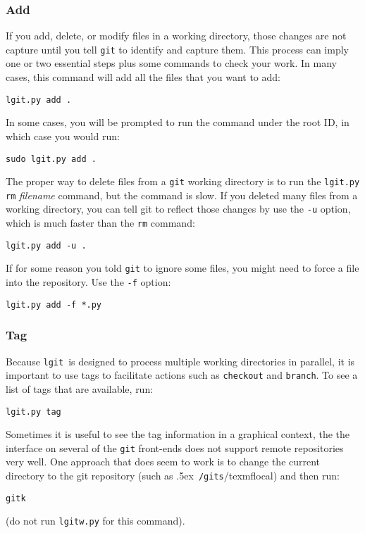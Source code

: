 \documentclass{ltxdoc}
\def\bobtilde{\lower.5ex\hbox{\tt \string~}}%
\def\ucmd#1{{\tt {#1}}}
\def\lgit{{\tt lgit}}
\def\mygits{\bobtilde\ucmd{/gits}}
\begin{document}
\subsubsection{Add}
If you add, delete, or modify files in a working directory, those changes are not capture until you tell \ucmd{git} to identify and capture them.  This process can imply one or two essential steps plus some commands to check your work. In many cases, this command will add all the files that you want to add:
\begin{verbatim}
lgit.py add .
\end{verbatim}
In some cases, you will be prompted to run the command under the root ID, in which case you would run:
\begin{verbatim}
sudo lgit.py add .
\end{verbatim}

The proper way to delete files from a \ucmd{git} working directory is to run the \ucmd{lgit.py rm} \emph{filename} command, but the command is slow.  If you deleted many files from a working directory, you can tell git to reflect those changes by use the \ucmd{-u} option, which is much faster than the \ucmd{rm} command:
\begin{verbatim}
lgit.py add -u .
\end{verbatim} 

If for some reason you told \ucmd{git} to ignore some files, you might need to force a file into the repository. Use the \ucmd{-f} option:
\begin{verbatim}
lgit.py add -f *.py
\end{verbatim}

\subsubsection{Tag}
Because \lgit\ is designed to process multiple working directories in parallel, it is important to use tags to facilitate actions such as \ucmd{checkout} and \ucmd{branch}.  To see a list of tags that are available, run:
\begin{verbatim}
lgit.py tag
\end{verbatim}

Sometimes it is useful to see the tag information in a graphical context, the the interface on several of the \ucmd{git} front-ends does not support remote repositories very well.  One approach that does seem to work is to change the current directory to the git repository (such as \mygits/texmflocal) and then run:
\begin{verbatim}
gitk
\end{verbatim}
(do not run \ucmd{lgitw.py} for this command).
\end{document}
